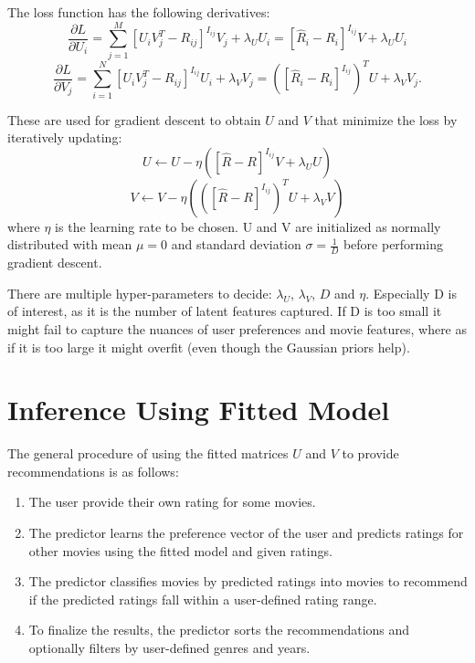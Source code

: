 \documentclass{article}
\begin{document}
The loss function has the following derivatives:
\begin{equation}
    \frac{\partial L}{\partial U_i} = \sum_{j=1}^M[U_iV_j^T-R_{ij}]^{I_{ij}}V_j + \lambda_UU_i = [\hat{R}_i-R_i]^{I_{ij}}V + \lambda_UU_i
\end{equation}
\begin{equation}
    \frac{\partial L}{\partial V_j} = \sum_{i=1}^N[U_iV_j^T-R_{ij}]^{I_{ij}}U_i + \lambda_VV_j = ([\hat{R}_i-R_i]^{I_{ij}})^TU + \lambda_VV_j.
\end{equation}

These are used for gradient descent to obtain $U$ and $V$ that minimize the loss by iteratively updating:
\begin{equation}
    U \gets U - \eta([\hat{R}-R]^{I_{ij}}V + \lambda_UU)
\end{equation}
\begin{equation}
    V \gets V - \eta(([\hat{R}-R]^{I_{ij}})^TU + \lambda_VV)
\end{equation}
where $\eta$ is the learning rate to be chosen. U and V are initialized as normally distributed with mean $\mu=0$ and standard deviation $\sigma = \frac{1}{D}$ before performing gradient descent.

There are multiple hyper-parameters to decide: $\lambda_U$, $\lambda_V$, $D$ and $\eta$. Especially D is of interest, as it is the number of latent features captured. If D is too small it might fail to capture the nuances of user preferences and movie features, where as if it is too large it might overfit (even though the Gaussian priors help).


\section{Inference Using Fitted Model}
The general procedure of using the fitted matrices $U$ and $V$ to provide recommendations is as follows:
\begin{enumerate}
    \item The user provide their own rating for some movies.
    \item The predictor learns the preference vector of the user and predicts ratings for other movies using the fitted model and given ratings.
    \item The predictor classifies movies by predicted ratings into movies to recommend if the predicted ratings fall within a user-defined rating range.
    \item To finalize the results, the predictor sorts the recommendations and optionally filters by user-defined genres and years.
\end{enumerate}
\end{document}

